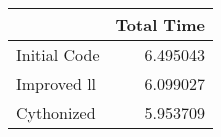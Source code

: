 \begin{tabular}{lr}
\toprule
{} &  Total Time \\
\midrule
Initial Code &    6.495043 \\
Improved ll  &    6.099027 \\
Cythonized   &    5.953709 \\
\bottomrule
\end{tabular}
